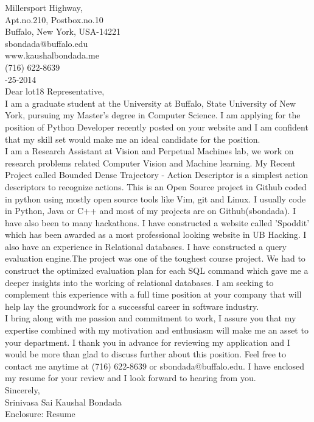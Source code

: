 \documentclass[10pt,letterpaper,oneside]{article}
\begin{document}
 Millersport Highway,\\
Apt.no.210, Postbox.no.10\\
Buffalo, New York, USA-14221\\
sbondada@buffalo.edu\\
www.kaushalbondada.me\\
(716) 622-8639\\

-25-2014\\
 
\noindent Dear lot18 Representative,\\
 
I am a graduate student at the University at Buffalo, State University of New York, pursuing my Master's degree in Computer Science. I am
applying for the position of Python Developer recently posted on your website and I am confident that my skill set would make me an ideal candidate for the position.\\

I am a Research Assistant at Vision and Perpetual Machines lab, we work on research problems related Computer Vision and Machine learning. My
Recent Project called Bounded Dense Trajectory - Action Descriptor is a simplest action descriptors to recognize actions. This is an Open Source project
in Github coded in python using mostly open source tools like Vim, git and Linux. I usually code in Python, Java or C++ and
most of my projects are on Github(sbondada). I have also been to many hackathons. I have constructed a website called 'Spoddit' which has
been awarded as a most professional looking website in UB Hacking. I also have an experience in Relational databases. I have constructed a
query evaluation engine.The project was one of the toughest course project. We had to construct the optimized evaluation plan for each SQL
command which gave me a deeper insights into the working of relational databases. I am seeking to complement this experience with a full time position at your company that will help lay the groundwork for a successful career in software industry.\\

 
I bring along with me passion and commitment to work, I assure you that my expertise combined with my motivation and enthusiasm will make me
an asset to your department. I thank you in advance for reviewing my application and I would be more than glad to discuss further about this position. Feel free to contact me anytime at (716) 622-8639 or sbondada@buffalo.edu. I have enclosed my resume for your review and I look forward to hearing from you.\\
 
\noindent Sincerely,\\
Srinivasa Sai Kaushal Bondada\\
Enclosure: Resume\\
\end{document}
